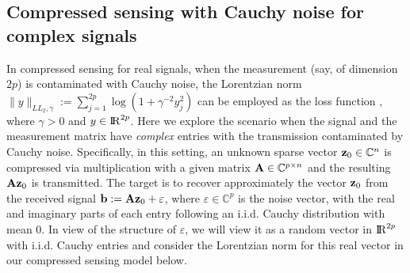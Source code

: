 \documentclass[10pt]{article}
\numberwithin{equation}{section}
\def\R{{\rm I\!R}}
\begin{document}
\subsection{Compressed sensing with Cauchy noise for complex signals}\label{sec6.2}
{\color{black} In compressed sensing for real signals, when the measurement (say, of dimension $2p$) is contaminated with Cauchy noise, the Lorentzian norm $\|y\|_{LL_2,\gamma}:= \sum\limits_{j=1}^{2p}\log(1 + \gamma^{-2}y_j^2)$ can be employed as the loss function \cite{CaBA10,CaRA16}, where $\gamma > 0$ and $y\in \R^{2p}$. Here we explore the scenario when the signal and the measurement matrix have \emph{complex} entries with the transmission contaminated by Cauchy noise. Specifically, in this setting, an unknown sparse vector ${\bf z}_0\in {\mathbb{C}}^n$ is compressed via multiplication with a given matrix ${\bf A}\in \mathbb{C}^{p\times n}$ and the resulting ${\bf A} {\bf z}_0$ is transmitted. The target is to recover approximately the vector ${\bf z}_0$ from the received signal ${\bf b} := {\bf A}{\bf z}_0 + \varepsilon$, where $\varepsilon \in {\mathbb{C}}^p$ is the noise vector, with the real and imaginary parts of each entry following an i.i.d. Cauchy distribution with mean $0$. In view of the structure of $\varepsilon$, we will view it as a random vector in $\R^{2p}$ with i.i.d. Cauchy entries and consider the Lorentzian norm for this real vector in our compressed sensing model below.

}
\end{document}
